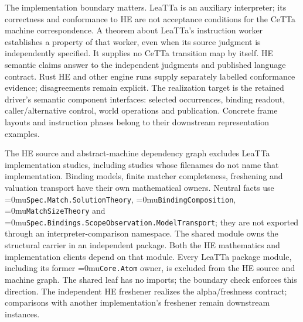 \documentclass[11pt,a4paper]{article}
\newcommand{\code}[1]{\texttt{\detokenize{#1}}}
\newcommand{\name}[1]{\textup{\Urlmuskip=0mu\relax\nolinkurl{#1}}}
\begin{document}
The implementation boundary matters. LeaTTa is an auxiliary interpreter;
its correctness and conformance to HE are not acceptance conditions for
the CeTTa machine correspondence. A theorem about LeaTTa's instruction
worker establishes a property of that worker, even when its source judgment
is independently specified. It supplies no CeTTa transition map by itself.
HE semantic claims answer to the independent judgments and published
language contract. Rust HE and other engine runs supply separately labelled
conformance evidence; disagreements remain explicit. The realization target
is the retained driver's semantic component interfaces: selected
occurrences, binding readout, caller/alternative control, world operations and
publication. Concrete frame layouts and instruction phases belong to their
downstream representation examples.

The HE source and abstract-machine dependency graph excludes LeaTTa
implementation studies, including studies whose filenames do not name that
implementation. Binding models, finite matcher completeness, freshening and
valuation transport have their own mathematical owners. Neutral facts use
\name{Spec.Match.SolutionTheory}, \name{BindingComposition},
\name{MatchSizeTheory} and
\name{Spec.Bindings.ScopeObservation.ModelTransport}; they are not exported
through an interpreter-comparison namespace. The shared
\code{MeTTailCore.MeTTaSyntax.Atom} module owns the structural carrier in an
independent package. Both the HE mathematics and implementation clients
depend on that module. Every LeaTTa package module, including its former
\name{Core.Atom} owner, is excluded from the HE source and machine graph.
The shared leaf has no imports; the boundary check enforces this direction.
The independent HE freshener realizes the
alpha/freshness contract; comparisons with another implementation's
freshener remain downstream instances.

\begin{center}
\end{center}
\end{document}
